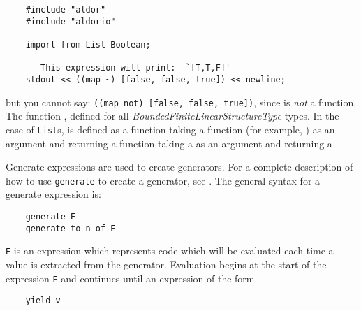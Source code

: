 \begin{small}
\begin{verbatim}
    #include "aldor"
    #include "aldorio"

    import from List Boolean;

    -- This expression will print:  `[T,T,F]'
    stdout << ((map ~) [false, false, true]) << newline;
\end{verbatim}
\end{small}

but you cannot say:  {\small \verb+((map not) [false, false, true])+},
since  is {\em not\/} a function. The \asharp{} function
, defined for all {\em BoundedFiniteLinearStructureType} types.
In the case of \verb+List+s,  is defined as a function taking
a function (for example, \ttin{~}) as an argument and returning a function
taking a  as an argument and returning a .





Generate expressions are used to create generators.
For a complete description of how to use {\tt generate} to create
a generator, see .  The general syntax for a
generate expression is:

\begin{small}
\begin{verbatim}
    generate E
    generate to n of E
\end{verbatim}
\end{small}


{\tt E} is an expression which represents code which will be evaluated
each time a value is extracted from the generator.  Evaluation begins
at the start of the expression {\tt E} and continues until an expression
of the form

\begin{small}
\begin{verbatim}
    yield v
\end{verbatim}
\end{small}

